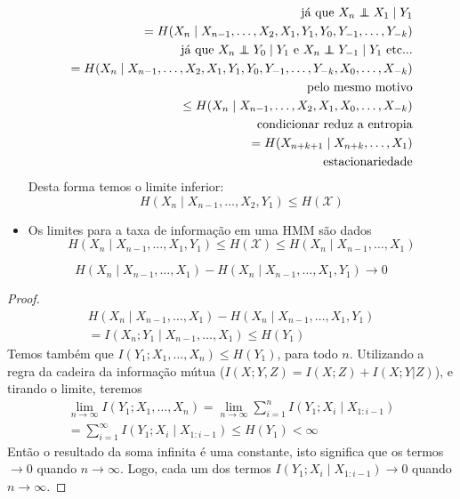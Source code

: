 \begin{frame}[allowframebreaks]
\begin{itemize}
\begin{eqnarray}
		\text{já que } X_n \independent X_1 \mid Y_1 \nonumber \\
		= H(X_n \mid X_{n-1}, \ldots, X_2, X_1,Y_1,Y_0,Y_{-1},\ldots,Y_{-k}) \\
		\text{já que } X_n \independent Y_0 \mid Y_1 \text{ e } X_n \independent Y_{-1} \mid Y_1 \text{ etc...} \nonumber \\
		= H(X_n \mid X_{n-1}, \ldots, X_2, X_1,Y_1,Y_0,Y_{-1},\ldots,Y_{-k},X_0,\ldots,X_{-k}) \nonumber \\
		\text{pelo mesmo motivo} \nonumber \\
		\leq H(X_n \mid X_{n-1}, \ldots, X_2, X_1,X_0,\ldots,X_{-k}) \nonumber \\
		\text{condicionar reduz a entropia} \nonumber \\
		= H(X_{n+k+1} \mid X_{n+k}, \ldots, X_1) \\
		\text{estacionariedade} \nonumber 
	\end{eqnarray}
 	Desta forma temos o limite inferior:
	\begin{equation}
	H(X_n \mid X_{n-1}, \ldots, X_2, Y_1) \leq H(\mathcal{X})
	\end{equation}
  \item Os limites para a taxa de informação em uma HMM são dados 
	\begin{equation}
        H(X_n \mid X_{n-1}, \ldots, X_1, Y_1) \leq H(\mathcal{X}) \leq H(X_n \mid X_{n-1}, \ldots, X_1)
	\end{equation}
  \end{itemize}


  \framebreak

  \begin{theorem}
  \begin{equation}
  H(X_n \mid X_{n-1}, \ldots , X_1) - H(X_n \mid X_{n-1}, \ldots, X_1, Y_1) \rightarrow 0
  \end{equation}
  \end{theorem}

  \begin{proof}
  \begin{eqnarray}
  H(X_n \mid X_{n-1}, \ldots , X_1) - H(X_n \mid X_{n-1}, \ldots, X_1, Y_1)  \nonumber \\
	= I(X_n ; Y_1 \mid X_{n-1}, \ldots, X_1) \leq H(Y_1)
  \end{eqnarray}
  Temos também que $I(Y_1 ; X_1, \ldots, X_n) \leq H(Y_1)$, para todo $n$.
  \proofbreak
  Utilizando a regra da cadeira da informação mútua ($I(X;Y,Z) = I(X;Z) + I(X;Y|Z)$), e tirando o limite, teremos
  \begin{eqnarray}
  \lim_{n \rightarrow \infty} I(Y_1 ; X_1, \ldots, X_n) =  \lim_{n \rightarrow \infty} \sum_{i=1}^n I(Y_1;X_i \mid X_{1:i-1}) \nonumber \\
	= \sum_{i=1}^\infty I(Y_1;X_i \mid X_{1:i-1}) \leq H(Y_1) < \infty
  \end{eqnarray} 
  Então o resultado da soma infinita é uma constante, isto significa que os termos $\rightarrow 0$ quando $n \rightarrow \infty$.
  Logo, cada um dos termos $I(Y_1;X_i \mid X_{1:i-1}) \rightarrow 0$ quando $n \rightarrow \infty$.
  \end{proof}


\end{frame}
